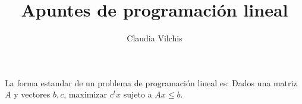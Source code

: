 \documentclass{article}
\title{Apuntes de programación lineal}
\author{Claudia Vilchis}
\begin{document}
\maketitle

La forma estandar de un problema de programación lineal es: Dados una
matriz $A$ y vectores $b,c$, maximizar $c^tx$ sujeto a $Ax\leq b$.
\end{document}
